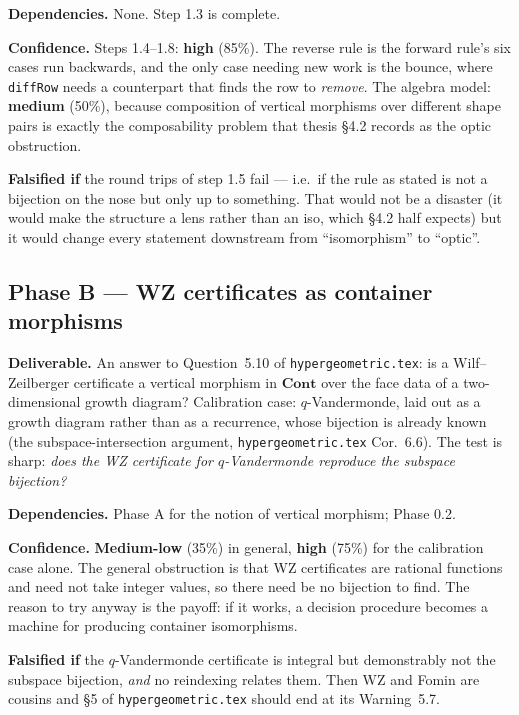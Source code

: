 \documentclass[11pt,a4paper]{article}
\theoremstyle{definition}
\theoremstyle{remark}
\newcommand{\cat}[1]{\mathbf{#1}}
\newcommand{\Cont}{\cat{Cont}}
\begin{document}
\textbf{Dependencies.} None. Step 1.3 is complete.

\textbf{Confidence.} Steps 1.4--1.8: \textbf{high} (85\%). The reverse rule is the
forward rule's six cases run backwards, and the only case needing new work is the
bounce, where \texttt{diffRow} needs a counterpart that finds the row to \emph{remove}.
The algebra model: \textbf{medium} (50\%), because composition of vertical morphisms
over different shape pairs is exactly the composability problem that thesis \S4.2
records as the optic obstruction.

\textbf{Falsified if} the round trips of step 1.5 fail --- i.e.\ if the rule as stated
is not a bijection on the nose but only up to something. That would not be a disaster
(it would make the structure a lens rather than an iso, which \S4.2 half expects) but
it would change every statement downstream from ``isomorphism'' to ``optic''.

\subsection*{Phase B --- WZ certificates as container morphisms}

\textbf{Deliverable.} An answer to Question~5.10 of \texttt{hypergeometric.tex}: is a
Wilf--Zeilberger certificate a vertical morphism in $\Cont$ over the face data of a
two-dimensional growth diagram? Calibration case: $q$-Vandermonde, laid out as a
growth diagram rather than as a recurrence, whose bijection is already known
(the subspace-intersection argument, \texttt{hypergeometric.tex} Cor.~6.6). The test is
sharp: \emph{does the WZ certificate for $q$-Vandermonde reproduce the subspace
bijection?}

\textbf{Dependencies.} Phase A for the notion of vertical morphism; Phase 0.2.

\textbf{Confidence.} \textbf{Medium-low} (35\%) in general, \textbf{high} (75\%) for
the calibration case alone. The general obstruction is that WZ certificates are
rational functions and need not take integer values, so there need be no bijection to
find. The reason to try anyway is the payoff: if it works, a decision procedure becomes
a machine for producing container isomorphisms.

\textbf{Falsified if} the $q$-Vandermonde certificate is integral but demonstrably not
the subspace bijection, \emph{and} no reindexing relates them. Then WZ and Fomin are
cousins and \S5 of \texttt{hypergeometric.tex} should end at its Warning~5.7.
\end{document}
